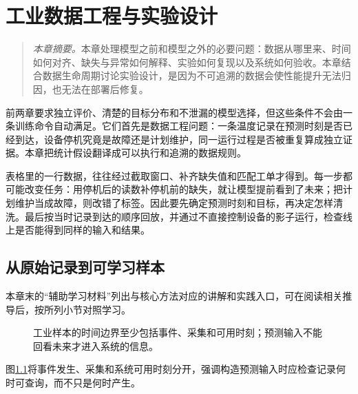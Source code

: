 ﻿\chapter{工业数据工程与实验设计}

\begin{quote}\small
\textit{本章摘要。}本章处理模型之前和模型之外的必要问题：数据从哪里来、时间如何对齐、缺失与异常如何解释、实验如何复现以及系统如何验收。本章结合数据生命周期讨论实验设计，是因为不可追溯的数据会使性能提升无法归因，也无法在部署后修复。
\end{quote}

前两章要求独立评价、清楚的目标分布和不泄漏的模型选择，但这些条件不会由一条训练命令自动满足。它们首先是数据工程问题：一条温度记录在预测时刻是否已经到达，设备停机究竟是故障还是计划维护，同一运行过程是否被重复算成独立证据。本章把统计假设翻译成可以执行和追溯的数据规则。

表格里的一行数据，往往经过截取窗口、补齐缺失值和匹配工单才得到。每一步都可能改变任务：用停机后的读数补停机前的缺失，就让模型提前看到了未来；把计划维护当成故障，则改错了标签。因此要先确定预测时刻和目标，再决定怎样清洗。最后按当时记录到达的顺序回放，并通过不直接控制设备的影子运行，检查线上是否能得到同样的输入和结果。

\section{从原始记录到可学习样本}

本章末的“辅助学习材料”列出与核心方法对应的讲解和实践入口，可在阅读相关推导后，按所列小节对照学习。

\begin{figure}[htbp]
\centering
{}
\caption{工业样本的时间边界至少包括事件、采集和可用时刻；预测输入不能回看未来才进入系统的信息。}
\label{fig:data-availability-timeline}
\end{figure}
图\ref{fig:data-availability-timeline}将事件发生、采集和系统可用时刻分开，强调构造预测输入时应检查记录何时可查询，而不只是何时产生。
